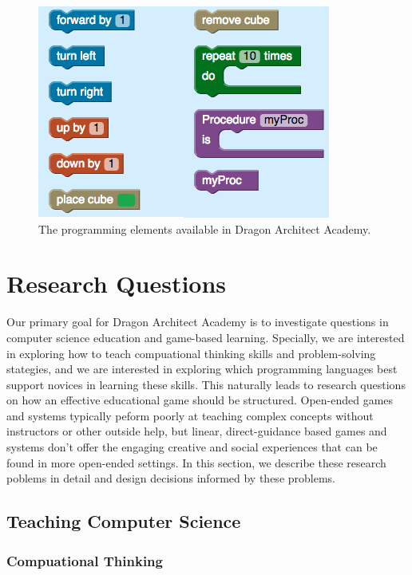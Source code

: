 \documentclass{sig-alternate}
\newcommand{\gametitle}{{\color{RoyalPurple} Dragon Architect Academy}}
\begin{document}
\begin{figure}[htb]
  \centering
  \includegraphics[width=\columnwidth]{images/toolbox-wide}
  \caption{The programming elements available in \gametitle{}.}
  \label{fig:toolbox}
\end{figure}


\section{Research Questions}
\label{sec:research}

Our primary goal for \gametitle{} is to investigate questions in computer science education and game-based learning. 
Specially, we are interested in exploring how to teach compuational thinking skills and problem-solving stategies, and we are interested in exploring which programming languages best support novices in learning these skills. 
This naturally leads to research questions on how an effective educational game should be structured.
Open-ended games and systems typically peform poorly at teaching complex concepts without instructors or other outside help, but linear, direct-guidance based games and systems don't offer the engaging creative and social experiences that can be found in more open-ended settings.
In this section, we describe these research poblems in detail and design decisions informed by these problems.

\subsection{Teaching Computer Science}

\subsubsection{Compuational Thinking}
\end{document}
